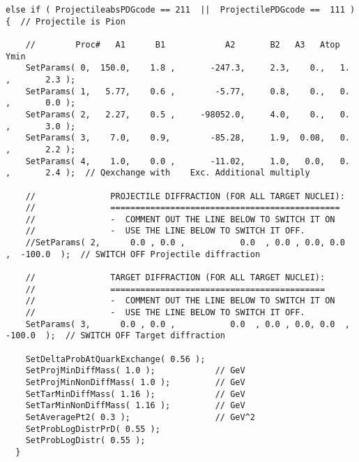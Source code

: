 \begin{lstlisting}
else if ( ProjectileabsPDGcode == 211  ||  ProjectilePDGcode ==  111 ) {  // Projectile is Pion 

    //        Proc#   A1      B1            A2       B2   A3   Atop       Ymin
    SetParams( 0,  150.0,    1.8 ,       -247.3,     2.3,    0.,   1. ,       2.3 );
    SetParams( 1,   5.77,    0.6 ,        -5.77,     0.8,    0.,   0. ,       0.0 );
    SetParams( 2,   2.27,    0.5 ,     -98052.0,     4.0,    0.,   0. ,       3.0 ); 
    SetParams( 3,    7.0,    0.9,        -85.28,     1.9,  0.08,   0. ,       2.2 );
    SetParams( 4,    1.0,    0.0 ,       -11.02,     1.0,   0.0,   0. ,       2.4 );  // Qexchange with    Exc. Additional multiply

    //               PROJECTILE DIFFRACTION (FOR ALL TARGET NUCLEI):
    //               ==============================================
    //               -  COMMENT OUT THE LINE BELOW TO SWITCH IT ON
    //               -  USE THE LINE BELOW TO SWITCH IT OFF.
    //SetParams( 2,      0.0 , 0.0 ,           0.0  , 0.0 , 0.0, 0.0  ,  -100.0  );  // SWITCH OFF Projectile diffraction

    //               TARGET DIFFRACTION (FOR ALL TARGET NUCLEI): 
    //               ===========================================
    //               -  COMMENT OUT THE LINE BELOW TO SWITCH IT ON
    //               -  USE THE LINE BELOW TO SWITCH IT OFF.
    SetParams( 3,      0.0 , 0.0 ,           0.0  , 0.0 , 0.0, 0.0  ,  -100.0  );  // SWITCH OFF Target diffraction
    
    SetDeltaProbAtQuarkExchange( 0.56 );
    SetProjMinDiffMass( 1.0 );            // GeV
    SetProjMinNonDiffMass( 1.0 );         // GeV 
    SetTarMinDiffMass( 1.16 );            // GeV
    SetTarMinNonDiffMass( 1.16 );         // GeV
    SetAveragePt2( 0.3 );                 // GeV^2
    SetProbLogDistrPrD( 0.55 );
    SetProbLogDistr( 0.55 );
  }
\end{lstlisting}

